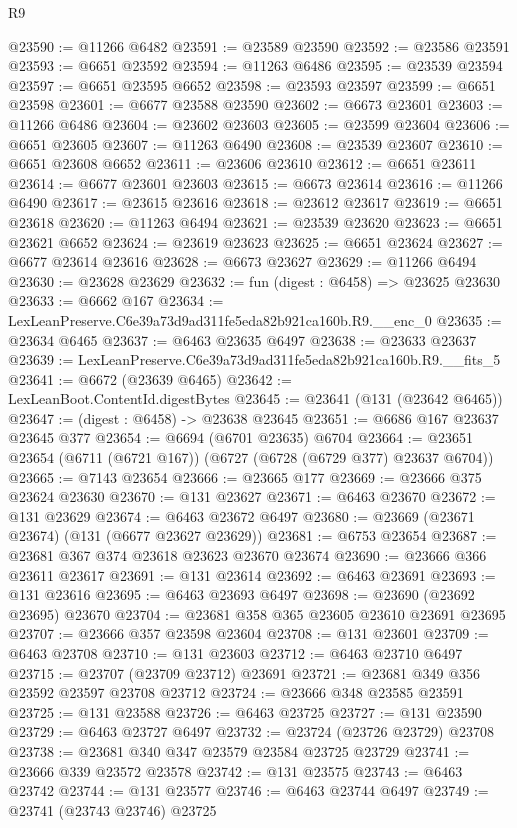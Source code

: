 \begin{lexlean}{R9}
\begin{coremodule}
@23590 := @11266 @6482
@23591 := @23589 @23590
@23592 := @23586 @23591
@23593 := @6651 @23592
@23594 := @11263 @6486
@23595 := @23539 @23594
@23597 := @6651 @23595 @6652
@23598 := @23593 @23597
@23599 := @6651 @23598
@23601 := @6677 @23588 @23590
@23602 := @6673 @23601
@23603 := @11266 @6486
@23604 := @23602 @23603
@23605 := @23599 @23604
@23606 := @6651 @23605
@23607 := @11263 @6490
@23608 := @23539 @23607
@23610 := @6651 @23608 @6652
@23611 := @23606 @23610
@23612 := @6651 @23611
@23614 := @6677 @23601 @23603
@23615 := @6673 @23614
@23616 := @11266 @6490
@23617 := @23615 @23616
@23618 := @23612 @23617
@23619 := @6651 @23618
@23620 := @11263 @6494
@23621 := @23539 @23620
@23623 := @6651 @23621 @6652
@23624 := @23619 @23623
@23625 := @6651 @23624
@23627 := @6677 @23614 @23616
@23628 := @6673 @23627
@23629 := @11266 @6494
@23630 := @23628 @23629
@23632 := fun (digest : @6458) => @23625 @23630
@23633 := @6662 @167
@23634 := LexLeanPreserve.C6e39a73d9ad311fe5eda82b921ca160b.R9.__enc_0
@23635 := @23634 @6465
@23637 := @6463 @23635 @6497
@23638 := @23633 @23637
@23639 := LexLeanPreserve.C6e39a73d9ad311fe5eda82b921ca160b.R9.__fits_5
@23641 := @6672 (@23639 @6465)
@23642 := LexLeanBoot.ContentId.digestBytes
@23645 := @23641 (@131 (@23642 @6465))
@23647 := (digest : @6458) -> @23638 @23645
@23651 := @6686 @167 @23637 @23645 @377
@23654 := @6694 (@6701 @23635) @6704
@23664 := @23651 @23654 (@6711 (@6721 @167)) (@6727 (@6728 (@6729 @377) @23637 @6704))
@23665 := @7143 @23654
@23666 := @23665 @177
@23669 := @23666 @375 @23624 @23630
@23670 := @131 @23627
@23671 := @6463 @23670
@23672 := @131 @23629
@23674 := @6463 @23672 @6497
@23680 := @23669 (@23671 @23674) (@131 (@6677 @23627 @23629))
@23681 := @6753 @23654
@23687 := @23681 @367 @374 @23618 @23623 @23670 @23674
@23690 := @23666 @366 @23611 @23617
@23691 := @131 @23614
@23692 := @6463 @23691
@23693 := @131 @23616
@23695 := @6463 @23693 @6497
@23698 := @23690 (@23692 @23695) @23670
@23704 := @23681 @358 @365 @23605 @23610 @23691 @23695
@23707 := @23666 @357 @23598 @23604
@23708 := @131 @23601
@23709 := @6463 @23708
@23710 := @131 @23603
@23712 := @6463 @23710 @6497
@23715 := @23707 (@23709 @23712) @23691
@23721 := @23681 @349 @356 @23592 @23597 @23708 @23712
@23724 := @23666 @348 @23585 @23591
@23725 := @131 @23588
@23726 := @6463 @23725
@23727 := @131 @23590
@23729 := @6463 @23727 @6497
@23732 := @23724 (@23726 @23729) @23708
@23738 := @23681 @340 @347 @23579 @23584 @23725 @23729
@23741 := @23666 @339 @23572 @23578
@23742 := @131 @23575
@23743 := @6463 @23742
@23744 := @131 @23577
@23746 := @6463 @23744 @6497
@23749 := @23741 (@23743 @23746) @23725

\end{coremodule}
\end{lexlean}
